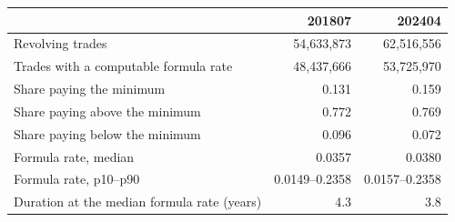 \begin{tabular}{lrr}
\toprule
 & 201807 & 202404 \\
\midrule
Revolving trades & 54,633,873 & 62,516,556 \\
Trades with a computable formula rate & 48,437,666 & 53,725,970 \\
Share paying the minimum & 0.131 & 0.159 \\
Share paying above the minimum & 0.772 & 0.769 \\
Share paying below the minimum & 0.096 & 0.072 \\
Formula rate, median & 0.0357 & 0.0380 \\
Formula rate, p10--p90 & 0.0149--0.2358 & 0.0157--0.2358 \\
Duration at the median formula rate (years) & 4.3 & 3.8 \\
\bottomrule
\end{tabular}
